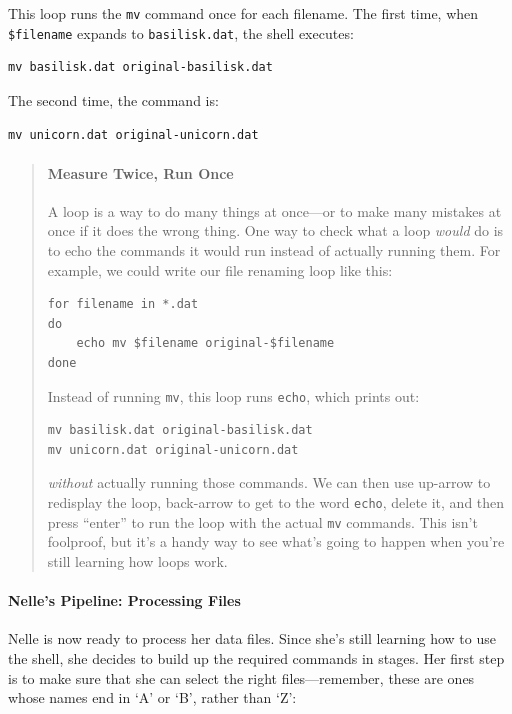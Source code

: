 \documentclass{book}
\begin{document}
This loop runs the \texttt{mv} command once for each filename. The first
time, when \texttt{\$filename} expands to \texttt{basilisk.dat}, the
shell executes:

\begin{verbatim}
mv basilisk.dat original-basilisk.dat
\end{verbatim}

The second time, the command is:

\begin{verbatim}
mv unicorn.dat original-unicorn.dat
\end{verbatim}

\begin{quote}
\mbox{}\paragraph{Measure Twice, Run Once}

A loop is a way to do many things at once---or to make many mistakes at
once if it does the wrong thing. One way to check what a loop
\emph{would} do is to echo the commands it would run instead of actually
running them. For example, we could write our file renaming loop like
this:

\begin{verbatim}
for filename in *.dat
do
    echo mv $filename original-$filename
done
\end{verbatim}

Instead of running \texttt{mv}, this loop runs \texttt{echo}, which
prints out:

\begin{verbatim}
mv basilisk.dat original-basilisk.dat
mv unicorn.dat original-unicorn.dat
\end{verbatim}

\emph{without} actually running those commands. We can then use up-arrow
to redisplay the loop, back-arrow to get to the word \texttt{echo},
delete it, and then press ``enter'' to run the loop with the actual
\texttt{mv} commands. This isn't foolproof, but it's a handy way to see
what's going to happen when you're still learning how loops work.
\end{quote}

\mbox{}\paragraph{Nelle's Pipeline: Processing Files}

Nelle is now ready to process her data files. Since she's still learning
how to use the shell, she decides to build up the required commands in
stages. Her first step is to make sure that she can select the right
files---remember, these are ones whose names end in `A' or `B', rather
than `Z':
\end{document}
